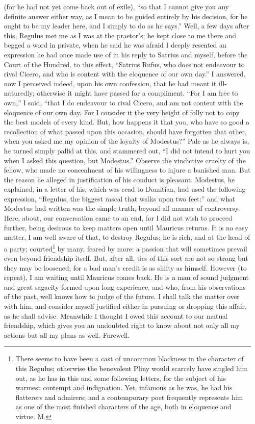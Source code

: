 (for he had not yet come back out of exile), ``so that I cannot give you
any definite answer either way, as I mean to be guided entirely by his
decision, for he ought to be my leader here, and I simply to do as he
says.'' Well, a few days after this, Regulus met me as I was at the
praetor's; he kept close to me there and begged a word in private, when he
said he was afraid I deeply resented an expression he had once made use of
in his reply to Satrius and myself, before the Court of the Hundred, to
this effect, ``Satrius Rufus, who does not endeavour to rival Cicero, and
who is content with the eloquence of our own day.'' I answered, now I
perceived indeed, upon his own confession, that he had meant it
ill-naturedly; otherwise it might have passed for a compliment. ``For I am
free to own,'' I said, ``that I do endeavour to rival Cicero, and am not
content with the eloquence of our own day. For I consider it the very
height of folly not to copy the best models of every kind. But, how
happens it that you, who have so good a recollection of what passed upon
this occasion, should have forgotten that other, when you asked me my
opinion of the loyalty of Modestus?'' Pale as he always is, he turned
simply pallid at this, and stammered out, ``I did not intend to hurt you
when I asked this question, but Modestus.'' Observe the vindictive cruelty
of the fellow, who made no concealment of his willingness to injure a
banished man. But the reason he alleged in justification of his conduct is
pleasant. Modestus, he explained, in a letter of his, which was read to
Domitian, had used the following expression, ``Regulus, the biggest rascal
that walks upon two feet:'' and what Modestus had written was the simple
truth, beyond all manner of controversy. Here, about, our conversation
came to an end, for I did not wish to proceed further, being desirous to
keep matters open until Mauricus returns. It is no easy matter, I am well
aware of that, to destroy Regulus; he is rich, and at the head of a party;
courted\footnote{There seems to have been a
cast of uncommon blackness in the character of this Regulus; otherwise the
benevolent Pliny would scarcely have singled him out, as he has in this
and some following letters, for the subject of his warmest contempt and
indignation. Yet, infamous as he was, he had his flatterers and admirers;
and a contemporary poet frequently represents him as one of the most
finished characters of the age, both in eloquence and virtue. M.}
by many, feared by more: a passion that will sometimes prevail even beyond
friendship itself. But, after all, ties of this sort are not so strong but
they may be loosened; for a bad man's credit is as shifty as himself.
However (to repeat), I am waiting until Mauricus comes back. He is a man
of sound judgment and great sagacity formed upon long experience, and who,
from his observations of the past, well knows how to judge of the future.
I shall talk the matter over with him, and consider myself justified
either in pursuing or dropping this affair, as he shall advise. Meanwhile
I thought I owed this account to our mutual friendship, which gives you an
undoubted right to know about not only all my actions but all my plans as
well. Farewell.

